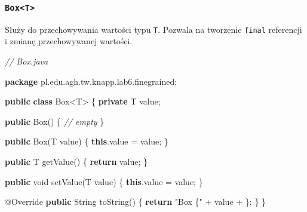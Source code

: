 \documentclass[11pt]{article}
\newenvironment{Shaded}{}{}
\newcommand{\KeywordTok}[1]{\textcolor[rgb]{0.00,0.44,0.13}{\textbf{{#1}}}}
\newcommand{\DataTypeTok}[1]{\textcolor[rgb]{0.56,0.13,0.00}{{#1}}}
\newcommand{\CharTok}[1]{\textcolor[rgb]{0.25,0.44,0.63}{{#1}}}
\newcommand{\StringTok}[1]{\textcolor[rgb]{0.25,0.44,0.63}{{#1}}}
\newcommand{\CommentTok}[1]{\textcolor[rgb]{0.38,0.63,0.69}{\textit{{#1}}}}
\newcommand{\FunctionTok}[1]{\textcolor[rgb]{0.02,0.16,0.49}{{#1}}}
\newcommand{\NormalTok}[1]{{#1}}
\newcommand{\ImportTok}[1]{{#1}}
\newcommand{\ControlFlowTok}[1]{\textcolor[rgb]{0.00,0.44,0.13}{\textbf{{#1}}}}
\newcommand{\OperatorTok}[1]{\textcolor[rgb]{0.40,0.40,0.40}{{#1}}}
\newcommand{\BuiltInTok}[1]{{#1}}
\newcommand{\AttributeTok}[1]{\textcolor[rgb]{0.49,0.56,0.16}{{#1}}}
\begin{document}
    \hypertarget{boxt}{%
\subsubsection{\texorpdfstring{\texttt{Box\textless{}T\textgreater{}}}{Box\textless T\textgreater{}}}\label{boxt}}

Służy do przechowywania wartości typu \texttt{T}. Pozwala na tworzenie
\texttt{final} referencji i zmianę przechowywanej wartości.

\begin{Shaded}
\begin{Highlighting}[]
\CommentTok{// Box.java}

\KeywordTok{package}\ImportTok{ pl}\OperatorTok{.}\ImportTok{edu}\OperatorTok{.}\ImportTok{agh}\OperatorTok{.}\ImportTok{tw}\OperatorTok{.}\ImportTok{knapp}\OperatorTok{.}\ImportTok{lab6}\OperatorTok{.}\ImportTok{finegrained}\OperatorTok{;}

\KeywordTok{public} \KeywordTok{class} \BuiltInTok{Box}\OperatorTok{\textless{}}\NormalTok{T}\OperatorTok{\textgreater{}} \OperatorTok{\{}
    \KeywordTok{private}\NormalTok{ T value}\OperatorTok{;}

    \KeywordTok{public} \BuiltInTok{Box}\OperatorTok{()} \OperatorTok{\{}
        \CommentTok{// empty}
    \OperatorTok{\}}

    \KeywordTok{public} \BuiltInTok{Box}\OperatorTok{(}\NormalTok{T value}\OperatorTok{)} \OperatorTok{\{}
        \KeywordTok{this}\OperatorTok{.}\FunctionTok{value} \OperatorTok{=}\NormalTok{ value}\OperatorTok{;}
    \OperatorTok{\}}

    \KeywordTok{public}\NormalTok{ T }\FunctionTok{getValue}\OperatorTok{()} \OperatorTok{\{}
        \ControlFlowTok{return}\NormalTok{ value}\OperatorTok{;}
    \OperatorTok{\}}

    \KeywordTok{public} \DataTypeTok{void} \FunctionTok{setValue}\OperatorTok{(}\NormalTok{T value}\OperatorTok{)} \OperatorTok{\{}
        \KeywordTok{this}\OperatorTok{.}\FunctionTok{value} \OperatorTok{=}\NormalTok{ value}\OperatorTok{;}
    \OperatorTok{\}}

    \AttributeTok{@Override}
    \KeywordTok{public} \BuiltInTok{String} \FunctionTok{toString}\OperatorTok{()} \OperatorTok{\{}
        \ControlFlowTok{return} \StringTok{"Box \{"} \OperatorTok{+}\NormalTok{ value }\OperatorTok{+} \CharTok{\textquotesingle{}\}\textquotesingle{}}\OperatorTok{;}
    \OperatorTok{\}}
\OperatorTok{\}}
\end{Highlighting}
\end{Shaded}
\end{document}

